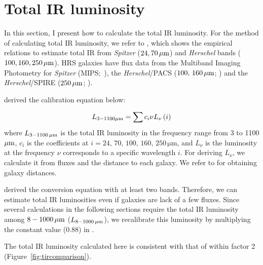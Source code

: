 \section{Total IR luminosity}\label{sec:tirluminosity}
In this section, I present how to calculate the total IR luminosity.
For the method of calculating total IR luminosity, we refer to \citet{Galametz2013}, which shows the empirical relations to estimate total IR from {\it Spitzer\/} ($24, 70\,\mathrm{\mu m}$) and {\it Herschel\/} bands ($100, 160, 250\,\mathrm{\mu m}$).
HRS galaxies have flux data from the Multiband Imaging Photometry for {\it Spitzer\/} (MIPS;~\citealt{Rieke2004, Bendo2012}), the {\it Herschel\/}/PACS ($100,\,160\,\mathrm{\mu m}$; \citealt{Cortese2014c}) and the {\it Herschel\/}/SPIRE ($250\,\mathrm{\mu m}$; \citealt{Ciesla2012a}).

\citet{Galametz2013} derived the calibration equation below:

\begin{equation}\label{eq:galametz}
    L_{\mathrm{3-1100\mathrm{\mu m}}} = \sum c_i \nu L_{\nu}\left(i\right)
\end{equation}
where $L_{\mathrm{3-1100\,\mu m}}$ is the total IR luminosity in the frequency range from 3 to 1100 $\mathrm{\mu m}$, $c_i$ is the coefficients at $i = 24,\,70,\,100,\,160,\,250\,\mathrm{\mu m}$, and $L_{\nu}$ is the luminosity at the frequency $\nu$ corresponds to a specific wavelength $i$.
For deriving $L_{\nu}$, we calculate it from fluxes and the distance to each galaxy.
We refer to \citet{Cortese2012} for obtaining galaxy distances.

\citet{Galametz2013} derived the conversion equation with at least two bands.
Therefore, we can estimate total IR luminosities even if galaxies are lack of a few fluxes.
Since several calculations in the following sections require the total IR luminosity among $8 - 1000\,\mathrm{\mu m}$ ($L_{\mathrm{8-1000\,\mathrm{\mu m}}}$), we recalibrate this luminosity by multiplying the constant value (0.88) in \citet{Takeuchi2005}.

The total IR luminosity calculated here is consistent with that of \citet{Ciesla2014} within factor 2 (Figure~\ref{fig:tircomparison}).

